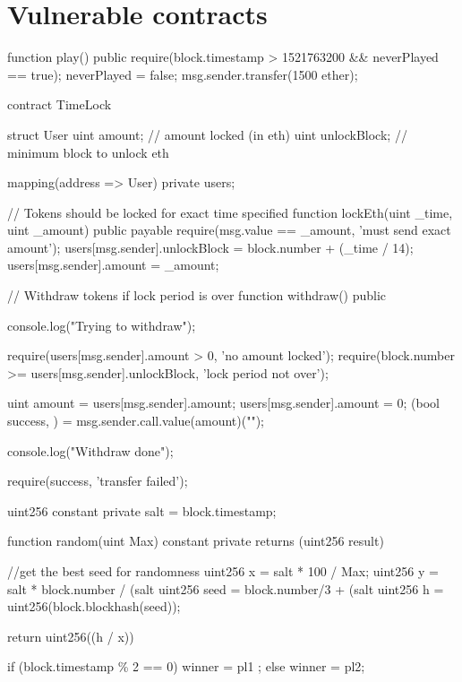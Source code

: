 \section{Vulnerable contracts}

\begin{solidity}[caption=NCC Group - Time manipulation \cite{DASP2018}]
    function play() public {
        require(block.timestamp > 1521763200 && neverPlayed == true);
        neverPlayed = false;
        msg.sender.transfer(1500 ether);
    }
\end{solidity}

\begin{solidity}[caption=SWC116 \cite{swc116}]
contract TimeLock {
    struct User {
        uint amount; // amount locked (in eth)
        uint unlockBlock; // minimum block to unlock eth
    }

    mapping(address => User) private users;

    // Tokens should be locked for exact time specified
    function lockEth(uint _time, uint _amount) public payable {
        require(msg.value == _amount, 'must send exact amount');
        users[msg.sender].unlockBlock = block.number + (_time / 14);
        users[msg.sender].amount = _amount;
    }

    // Withdraw tokens if lock period is over
    function withdraw() public {
        console.log("Trying to withdraw");

        require(users[msg.sender].amount > 0, 'no amount locked');
        require(block.number >= users[msg.sender].unlockBlock, 'lock period not over');

        uint amount = users[msg.sender].amount;
        users[msg.sender].amount = 0;
        (bool success, ) = msg.sender.call.value(amount)("");

        console.log("Withdraw done");

        require(success, 'transfer failed');
    }
}
\end{solidity}

\begin{solidity}[caption=The Run smart contract \cite{therun_contract}]
    uint256 constant private salt =  block.timestamp;
    
    function random(uint Max) constant private returns (uint256 result){
        //get the best seed for randomness
        uint256 x = salt * 100 / Max;
        uint256 y = salt * block.number / (salt %
        uint256 seed = block.number/3 + (salt %
        uint256 h = uint256(block.blockhash(seed)); 
    
        return uint256((h / x)) %
    }
\end{solidity}

\begin{solidity}[caption=Timestamp depended contract \cite{SmartCheck2018}]
    if (block.timestamp \% 2 == 0) winner = pl1 ; else winner = pl2;
\end{solidity}
